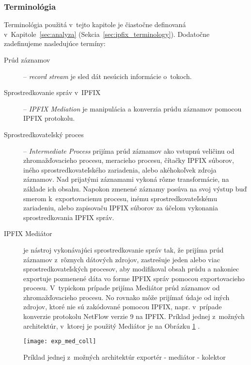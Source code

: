 \subsubsection{Terminológia}
Terminológia použitá v~tejto kapitole je čiastočne definovaná v~Kapitole~\ref{sec:analyza} 
(Sekcia~\ref{sec:ipfix_terminology}). 
Dodatočne zadefinujeme nasledujúce termíny:
\begin{description}
 \item[Prúd záznamov] -- \emph{record stream} je sled dát nesúcich informácie o~tokoch.
 
 \item[Sprostredkovanie správ v~IPFIX] -- \emph{IPFIX Mediation} je manipulácia a konverzia prúdu záznamov
 pomocou IPFIX protokolu.
 
 \item[Sprostredkovateľský proces] -- \emph{Intermediate Process} prijíma prúd záznamov ako vstupnú 
 veličinu od zhromažďovacieho procesu, meracieho procesu, čítačky IPFIX súborov, iného 
 sprostredkovateľského zariadenia, alebo akéhokoľvek zdroja záznamov. Nad prijatými záznamami
 vykoná rôzne transformácie, na základe ich obsahu. Napokon zmenené záznamy posúva na svoj výstup buď
 smerom k~exportovaciemu procesu, inému sprostredkovateľskému zariadeniu, alebo zapisovaču IPFIX súborov
 za účelom vykonania sprostredkovania IPFIX správ.
 
 \item[IPFIX Mediátor] je nástroj vykonávajúci sprostredkovanie správ tak, že prijíma prúd záznamov 
 z~rôznych dátových zdrojov, zastrešuje jeden alebo viac sprostredkovateľských procesov,  
 aby modifikoval obsah prúdu a nakoniec exportuje pozmenené dáta vo forme IPFIX správ pomocou exportovacieho
 procesu. V~typickom prípade prijíma Mediátor prúd záznamov od zhromažďovacieho procesu. No rovnako môže
 prijímať údaje od iných zdrojov, ktoré nie sú zakódované pomocou IPFIX, napr. v~prípade konverzie 
 protokolu NetFlow verzie 9 \citep{rfc3954} na IPFIX. Príklad jednej z~možných architektúr, 
 v~ktorej je použitý Mediátor je na Obrázku \ref{o:exp_med_coll} \citep{rfc5982}.
\end{description}

\begin{figure}[ht!]
\centering
\texttt{[image: exp\_med\_coll]}
\caption{Príklad jednej z~možných architektúr exportér - mediátor - kolektor}\label{o:exp_med_coll}
\end{figure}



